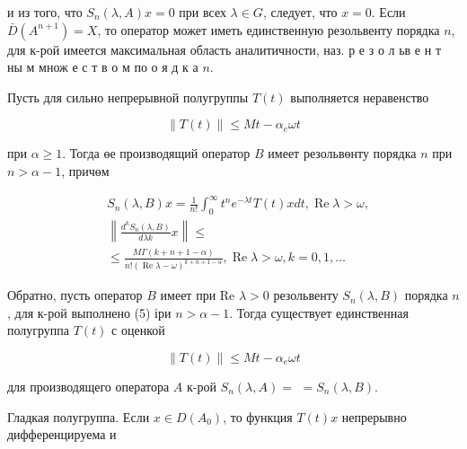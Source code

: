 \documentclass[10pt]{article}
\begin{document}
и из того, что $S_{n}(\lambda, A) x=0$ при всех $\lambda \in G$, следует, что $x=0$. Если $\bar{D}\left(A^{n+1}\right)=X$, то оператор может иметь единственную резольвенту порядка $n$, для к-рой имеется максимальная область аналитичности, наз. р е з о л ьв е н т ны м множ е с т в о м по о я д к а $n$.



Пусть для сильно непрерывной полугруппы $T(t)$ выполняется неравенство



\[

\|T(t)\| \leqslant M t-\alpha_{e} \omega t

\]



при $\alpha \geqslant 1$. Тогда өе производящий оператор $B$ имеет резольвөнту порядка $n$ при $n>\alpha-1$, причөм



\[

\begin{aligned}

& S_{n}(\lambda, B) x=\frac{1}{n !} \int_{0}^{\infty} t^{n} e^{-\lambda t} T(t) x d t, \operatorname{Re} \lambda>\omega, \\

& \left\|\frac{d^{k} S_{n}(\lambda, B)}{d \lambda k} x\right\| \leqslant \\

& \leqslant \frac{M \Gamma(k+n+1-\alpha)}{n !(\operatorname{Re} \lambda-\omega)^{k+n+1-\alpha}}, \operatorname{Re} \lambda>\omega, k=0,1, \ldots

\end{aligned}

\]



Обратно, пусть оператор $B$ имеет при Re $\lambda>0$ резольвенту $S_{n}(\lambda, B)$ порядка $n$, для к-рой выполнено (5) іри $n>\alpha-1$. Тогда существует единственная полугруппа $T(t)$ с оценкой



\[

\|T(t)\| \leqslant M t-\alpha_{e} \omega t

\]



для производящего оператора $A$ к-рой $S_{n}(\lambda, A)=$ $=S_{n}(\lambda, B)$.



Гладкая полугруппа. Если $x \in D\left(A_{0}\right)$, то функция $T(t) x$ непрерывно дифференцируема и
\end{document}

